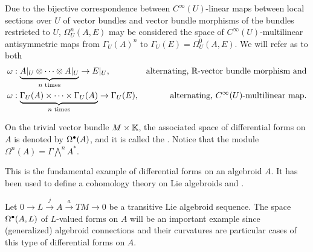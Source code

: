 \begin{remark}\label{remarkFOrmsHave2Ways2FormsALternativeVersion}
Due to the bijective correspondence between $C^\infty(U)$-linear maps between local sections over $U$ of vector bundles and vector bundle morphisms of the bundles restricted to $U$, $\Omega_U^n(A, E)$ may be considered the space of $C^\infty(U)$-multilinear antisymmetric maps from $\Gamma_U(A)^n$ to $\Gamma_U(E) = \Omega_U^0(A, E)$. We will refer as  to both
\begin{align}
    \omega &: \underbrace{A|_U \otimes \cdots \otimes A|_U}_{\text{$n$ times}} \to E|_U, & \text{alternating, $\mathbb{R}$-vector bundle morphism and}\\
    \omega &: \underbrace{\Gamma_U(A) \times \cdots \times \Gamma_U(A)}_{\text{$n$ times}} \to \Gamma_U(E), & \text{alternating, $C^\infty(U)$-multilinear map}.
\end{align}
    
    
\end{remark}

\lin



\begin{example}
On the trivial vector bundle $M \times \mathbb{K}$, the associated space of differential forms on $A$ is denoted by $\textcolor{black}{\textcolor{black}{\Omega^\bullet(A)}}$, and it is called the . Notice that the module $\Omega^n(A) = \Gamma \bigwedge^n A^*$.

This is the fundamental example of differential forms on an algebroid $A$. It has been used to define a cohomology theory on Lie algebroids and .
\end{example}

\begin{example}
Let $0 \to L \xrightarrow{j} A \xrightarrow{a} TM \to 0$ be a transitive Lie algebroid sequence.
The space $\textcolor{black}{\Omega^\bullet(A, L)}$ of $L$-valued forms on $A$ will be an important example since (generalized) algebroid connections and their curvatures are particular cases of this type of differential forms on $A$.
\end{example}

